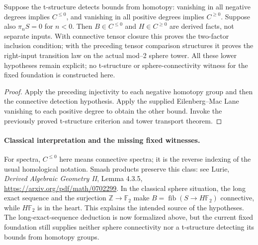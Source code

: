 \begin{proposition}
  \label{prop:h6-unit-fiber-connectivity-from-sphere}
  \leanok
  Suppose the t-structure detects bounds from homotopy: vanishing in all
  negative degrees implies $C^{\le0}$, and vanishing in all positive
  degrees implies $C^{\ge0}$. Suppose also $\pi_nS=0$ for $n<0$.
  Then $B\in C^{\le0}$ and $H\in C^{\ge0}$ are derived facts, not
  separate inputs. With connective tensor closure this proves the
  two-factor inclusion condition; with the preceding tensor comparison
  structures it proves the right-input transition law on the actual
  mod--2 sphere tower. All these lower hypotheses remain explicit; no
  t-structure or sphere-connectivity witness for the fixed foundation is
  constructed here.
\end{proposition}
\begin{proof}
  Apply the preceding injectivity to each negative homotopy group and then
  the connective detection hypothesis. Apply the supplied Eilenberg--Mac Lane
  vanishing to each positive degree to obtain the other bound. Invoke the
  previously proved t-structure criterion and tower transport theorem.
  \leanok
\end{proof}

\paragraph{Classical interpretation and the missing fixed witnesses.}
For spectra, $C^{\le0}$ here means connective spectra; it is the reverse
indexing of the usual homological notation. Smash products preserve this
class: see Lurie, \emph{Derived Algebraic Geometry II}, Lemma 4.3.5,
\url{https://arxiv.org/pdf/math/0702299}. In the classical sphere situation,
the long exact sequence and the surjection $\mathbb Z\to\mathbb F_2$
make $B=\operatorname{fib}(S\to H\mathbb F_2)$ connective, while
$H\mathbb F_2$ is in the heart. This explains the intended source of the
hypotheses. The long-exact-sequence deduction is now formalized above, but
the current fixed foundation still supplies neither sphere connectivity
nor a t-structure detecting its bounds from homotopy groups.

